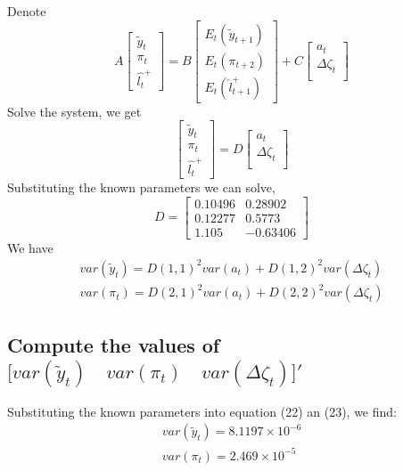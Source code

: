 \documentclass[12pt]{article}
\begin{document}
Denote
 \begin{equation}
A \left[
\begin{array}{c}
\tilde{y}_{t}\\
\pi_{t}\\
\hat{l_{t}}^{+}
\end{array}
\right]=B\left[
\begin{array}{c}
E_{t}(\tilde{y}_{t+1})\\
E_{t}(\pi_{t+2})\\
E_{t}(\hat{l}_{t+1}^{+})
\end{array}
\right]+C\left[
\begin{array}{c}
 a_t    \\
   \Delta\zeta_{t} \\  
\end{array}
\right]
\end{equation}
Solve the system, we get 
\begin{equation}
\left[
\begin{array}{c}
\tilde{y}_{t}\\
\pi_{t}\\
\hat{l_{t}}^{+}
\end{array}
\right]=D \left[
\begin{array}{c}
 a_t    \\
   \Delta\zeta_{t} \\  
\end{array}
\right]
\end{equation}
Substituting the known parameters we can solve,
 \begin{equation}
D =
\left[
\begin{array}{cc}
  0.10496 & 0.28902   \\
 0.12277 &    0.5773 \\
  1.105&   −0.63406  
\end{array}
\right]
\end{equation}
We have
 \begin{gather}
 var(\tilde{y}_{t}) = D(1,1)^2 var(a_t) + D(1,2)^2 var( \Delta\zeta_{t})\\
 var(\pi_{t}) = D(2,1)^2 var(a_t) + D(2,2)^2 var( \Delta\zeta_{t})
\end{gather}

\subsection{Compute the values of $\big[ var(\tilde{y}_t)\quad var(\pi_t) \quad var(\Delta\zeta_t) \big]'$ }
Substituting the known parameters into equation (22) an (23), we find:
\begin{equation*}
\begin{aligned}
var(\tilde{y}_{t}) = 8.1197 \times 10^{-6}\\
var(\pi_{t}) = 2.469 \times 10^{-5}\\
\end{aligned}
\end{equation*}
\end{document}
